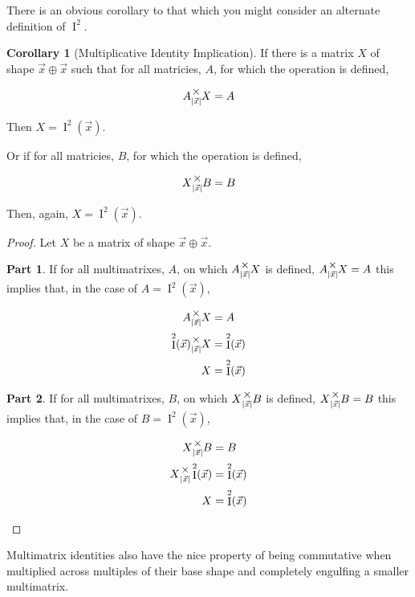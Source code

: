 \documentclass[12pt]{book}
\theoremstyle{plain}
\theoremstyle{definition}
\newtheorem{corollary}{Corollary}[theorem]
\theoremstyle{ppart}
\newtheorem{ppart}{Part}
\theoremstyle{case}
\theoremstyle{solution}
\DeclareMathOperator{\Ident}{I}
\newcommand{\mmult}[1]{\text{\raisebox{1ex}{$\underset{#1}{\times}$}}}
\newcommand{\shape}[1]{\left|#1\right|}
\begin{document}
There is an obvious corollary to that which you might consider an
alternate definition of $\Ident^2$.

\begin{corollary}[Multiplicative Identity Implication]
\label{mm_ident_imp}
If there is a matrix $X$ of shape $\vec{x} \oplus \vec{x}$ such that
for all matricies, $A$, for which the operation is defined,

\[A \mmult{\shape{\vec{x}}} X = A \]

Then $X = \Ident^2(\vec{x})$.

Or if for all matricies, $B$, for which the operation is defined,

\[X \mmult{\shape{\vec{x}}} B = B \]

Then, again, $X = \Ident^2(\vec{x})$.
\end{corollary}
\begin{proof}
Let $X$ be a matrix of shape $\vec{x} \oplus \vec{x}$. 
\begin{ppart}
If for all multimatrixes, $A$, on which $A \mmult{\shape{\vec{x}}} X$ is defined, 
$A \mmult{\shape{\vec{x}}} X = A$ this implies that, in the case of $A = \Ident^2(\vec{x})$,

\begin{align*}
  A \mmult{\shape{\vec{x}}} X &= A \\
 \Ident^2(\vec{x}) \mmult{\shape{\vec{x}}} X &= \Ident^2(\vec{x}) \\
  X &= \Ident^2(\vec{x}) 
\end{align*}
\end{ppart}
\begin{ppart}
If for all multimatrixes, $B$, on which $X \mmult{\shape{\vec{x}}} B$ is defined, 
$X \mmult{\shape{\vec{x}}} B = B$ this implies that, in the case of $B = \Ident^2(\vec{x})$,

\begin{align*}
  X \mmult{\shape{\vec{x}}} B &= B \\
  X \mmult{\shape{\vec{x}}} \Ident^2(\vec{x}) &= \Ident^2(\vec{x}) \\
  X &= \Ident^2(\vec{x}) 
\end{align*}
\end{ppart}
\end{proof}

Multimatrix identities also have the nice property of being commutative when multiplied
across multiples of their base shape and completely engulfing a smaller multimatrix.
\end{document}
